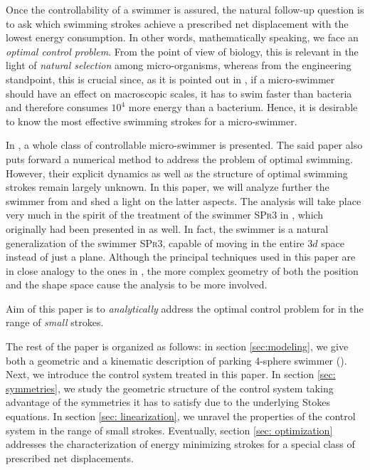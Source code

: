 Once the controllability of a swimmer is assured, the natural follow-up question is to ask which swimming strokes achieve a prescribed net displacement with the lowest energy consumption. In other words, mathematically speaking, we face an \emph{optimal control problem}. From the point of view of biology, this is relevant in the light of \emph{natural selection} among micro-organisms, whereas from the engineering standpoint, this is crucial since, as it is pointed out in \cite{Avron2004}, if a micro-swimmer should have an effect on macroscopic scales, it has to swim faster than bacteria and therefore consumes $10^4$ more energy than a bacterium. Hence, it is desirable to know the most effective swimming strokes for a micro-swimmer.

In \cite{Alouges2013}, a whole class of controllable micro-swimmer is presented. The said paper also puts forward a numerical method to address the problem of optimal swimming. However, their explicit dynamics as well as the structure of optimal swimming strokes remain largely unknown. In this paper, we will analyze further the swimmer \spr from \cite{Alouges2013} and shed a light on the latter aspects. The analysis will take place very much in the spirit of the treatment of the swimmer \textsc{SPr3} in \cite{Alouges2017}, which originally had been presented in \cite{Alouges2013} as well. In fact, the swimmer \spr is a natural generalization of the swimmer \textsc{SPr3}, capable of moving in the entire $3d$ space instead of just a plane. Although the principal techniques used in this paper are in close analogy to the ones in \cite{Alouges2017}, the more complex geometry of both the position and the shape space cause the analysis to be more involved.

Aim of this paper is to \emph{analytically} address the optimal control problem for \spr in the range of \emph{small} strokes.

The rest of the paper is organized as follows: in section \ref{sec:modeling}, we give both a geometric and a kinematic description of parking 4-sphere swimmer (\spr). Next, we introduce the control system treated in this paper. In section \ref{sec: symmetries}, we study the geometric structure of the control system taking advantage of the symmetries it has to satisfy due to the underlying Stokes  equations. In section \ref{sec: linearization}, we unravel the properties of the control system in the range of small strokes. Eventually, section \ref{sec: optimization} addresses the characterization of energy minimizing strokes for a special class of prescribed net displacements.




